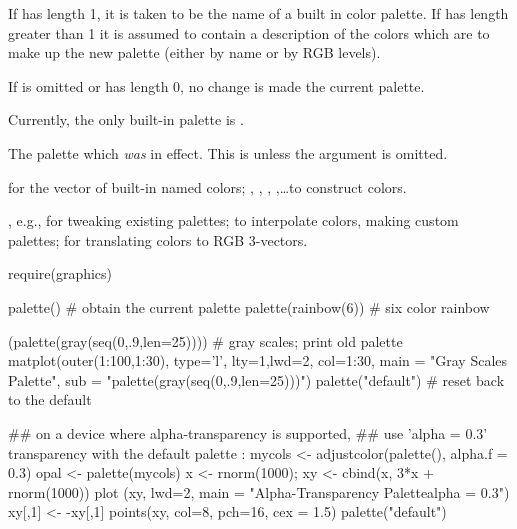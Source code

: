 %
\begin{Details}\relax
If  has length 1, it is taken to be the name of
a built in color palette.  If  has length greater
than 1 it is assumed to contain a description of the colors
which are to make up the new palette (either by name or
by RGB levels).

If  is omitted or has length 0, no change is made
the current palette.

Currently, the only built-in palette is .
\end{Details}
%
\begin{Value}
The palette which \emph{was} in effect.  This is 
unless the argument is omitted.
\end{Value}
%
\begin{SeeAlso}\relax
{} for the vector of built-in named colors;
, , ,
,\dots to construct colors.

, e.g., for tweaking existing palettes;
 to interpolate colors, making custom palettes;
 for translating colors to RGB 3-vectors.
\end{SeeAlso}
%
\begin{Examples}
\begin{ExampleCode}
require(graphics)

palette()               # obtain the current palette
palette(rainbow(6))     # six color rainbow

(palette(gray(seq(0,.9,len=25)))) # gray scales; print old palette
matplot(outer(1:100,1:30), type='l', lty=1,lwd=2, col=1:30,
        main = "Gray Scales Palette",
        sub = "palette(gray(seq(0,.9,len=25)))")
palette("default")      # reset back to the default

## on a device where alpha-transparency is supported,
##  use 'alpha = 0.3' transparency with the default palette :
mycols <- adjustcolor(palette(), alpha.f = 0.3)
opal <- palette(mycols)
x <- rnorm(1000); xy <- cbind(x, 3*x + rnorm(1000))
plot (xy, lwd=2,
       main = "Alpha-Transparency Palette\n alpha = 0.3")
xy[,1] <- -xy[,1]
points(xy, col=8, pch=16, cex = 1.5)
palette("default")
\end{ExampleCode}
\end{Examples}
